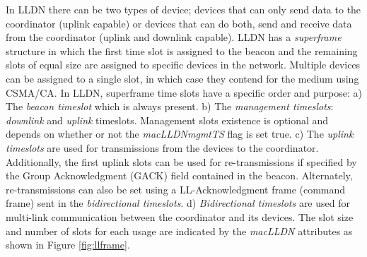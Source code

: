 \documentclass[conference]{IEEEtran}
\begin{document}
In LLDN there can be two types of device; devices that can only send data to the coordinator (uplink capable) or devices that can do both, send and receive data from the coordinator (uplink and downlink capable). LLDN has a \textit{superframe} structure in which the first time slot is assigned to the beacon and the remaining slots of equal size are assigned to specific devices in the network. Multiple devices can be assigned to a single slot, in which case they contend for the medium using CSMA/CA. In LLDN, superframe time slots have a specific order and purpose: a) The \textit{beacon timeslot} which is always present. b) The \textit{management timeslots}: \textit{downlink} and \textit{uplink} timeslots. Management slots existence is optional and depends on whether or not the \textit{macLLDNmgmtTS} flag is set true. c) The \textit{uplink timeslots} are used for transmissions from the devices to the coordinator. Additionally, the first uplink slots can be used for re-transmissions if specified by the Group Acknowledgment (GACK) field contained in the beacon. Alternately, re-transmissions can also be set using a LL-Acknowledgment frame (command frame) sent in the \textit{bidirectional timeslots}.  d) \textit{Bidirectional timeslots} are used for multi-link communication between the coordinator and its devices. The slot size and number of slots for each usage are indicated by the \textit{macLLDN} attributes as shown in Figure \ref{fig:llframe}.
\end{document}
